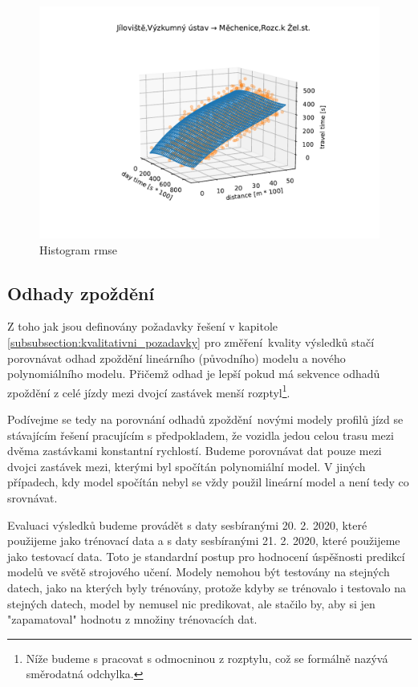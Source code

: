 \begin{figure}
	\centering
  \includegraphics[width=1\linewidth]{../img/thrd_degree}
  \caption{Histogram \gls{rmse}}
  \label{fig:thrd_degree}
\end{figure}


\subsection{Odhady zpoždění} \label{subsection:odhady_zpozdeni}

Z toho jak jsou definovány požadavky řešení v kapitole \ref{subsubsection:kvalitativni_pozadavky} pro změření kvality výsledků stačí porovnávat odhad zpoždění lineárního (původního) modelu a nového polynomiálního modelu. Přičemž odhad je lepší pokud má sekvence odhadů zpoždění z celé jízdy mezi dvojcí zastávek menší rozptyl\footnote{Níže budeme s pracovat s odmocninou z rozptylu, což se formálně nazývá směrodatná odchylka.}.

\bigbreak

Podívejme se tedy na porovnání odhadů zpoždění novými modely profilů jízd se stávajícím řešení pracujícím s předpokladem, že vozidla jedou celou trasu mezi dvěma zastávkami konstantní rychlostí. Budeme porovnávat dat pouze mezi dvojci zastávek mezi, kterými byl spočítán polynomiální model. V jiných případech, kdy model spočítán nebyl se vždy použil lineární model a není tedy co srovnávat.

\bigbreak

Evaluaci výsledků budeme provádět s daty sesbíranými 20. 2. 2020, které použijeme jako trénovací data a s daty sesbíranými 21. 2. 2020, které použijeme jako testovací data. Toto je standardní postup pro hodnocení úspěšnosti predikcí modelů ve světě strojového učení. Modely nemohou být testovány na stejných datech, jako na kterých byly trénovány, protože kdyby se trénovalo i testovalo na stejných datech, model by nemusel nic predikovat, ale stačilo by, aby si jen "zapamatoval" hodnotu z množiny trénovacích dat.

